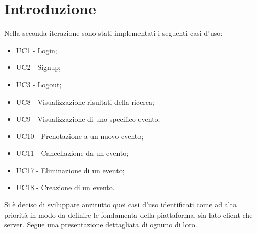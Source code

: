 \section{Introduzione}
Nella seconda iterazione sono stati implementati i seguenti casi d'uso:
\begin{itemize}
	\item UC1 - Login;
	\item UC2 - Signup;
	\item UC3 - Logout;
	\item UC8 - Visualizzazione risultati della ricerca;
	\item UC9 - Visualizzazione di uno specifico evento;
	\item UC10 - Prenotazione a un nuovo evento;
	\item UC11 - Cancellazione da un evento;
	\item UC17 - Eliminazione di un evento;
	\item UC18 - Creazione di un evento.
\end{itemize}
Si è deciso di sviluppare anzitutto quei casi d'uso identificati come ad alta priorità in modo da definire
le fondamenta della piattaforma, sia lato client che server.
Segue una presentazione dettagliata di ognuno di loro.
